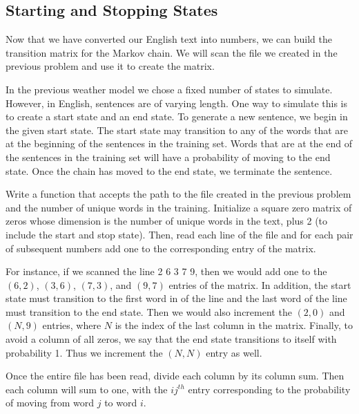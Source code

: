 \subsection*{Starting and Stopping States} %

Now that we have converted our English text into numbers, we can build the transition matrix for the Markov chain.
We will scan the file we created in the previous problem and use it to create the matrix.

In the previous weather model we chose a fixed number of states to simulate.
However, in English, sentences are of varying length.
One way to simulate this is to create a start state and an end state.
To generate a new sentence, we begin in the given start state.
The start state may transition to any of the words that are at the beginning of the sentences in the training set.
Words that are at the end of the sentences in the training set will have a probability of moving to the end state.
Once the chain has moved to the end state, we terminate the sentence.

\begin{problem} %
Write a function that accepts the path to the file created in the previous problem and the number of unique words in the training.
Initialize a square zero matrix of zeros whose dimension is the number of unique words in the text, plus 2 (to include the start and stop state).
Then, read each line of the file and for each pair of subsequent numbers add one to the corresponding entry of the matrix.

For instance, if we scanned the line 2 6 3 7 9, then we would add one to the $(6,2)$, $(3,6)$, $(7,3)$, and $(9,7)$ entries of the matrix.
In addition, the start state must transition to the first word in of the line and the last word of the line must transition to the end state.
Then we would also increment the $(2,0)$ and $(N,9)$ entries, where $N$ is the index of the last column in the matrix.
Finally, to avoid a column of all zeros, we say that the end state transitions to itself with probability 1.
Thus we increment the $(N,N)$ entry as well.

Once the entire file has been read, divide each column by its column sum.
Then each column will sum to one, with the $ij^{th}$ entry corresponding to the probability of moving from word $j$ to word $i$.
\label{problem:chainmaker}
\end{problem}

